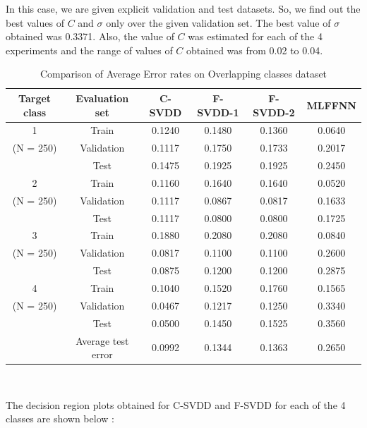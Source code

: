 \documentclass{article} %
\begin{document}
In this case, we are given explicit validation and test datasets. So, we find out the best values of $C$ and $\sigma$ only over the given validation set. The best value of $\sigma$ obtained was 0.3371. Also, the value of $C$ was estimated for each of the 4 experiments and the range of values of $C$ obtained was from 0.02 to 0.04.
\begin{table}[H]
\begin{center}
\caption{Comparison of Average Error rates on Overlapping classes dataset}
\begin{tabular}{|c|c|c|c|c|c|}
\hline
Target class & Evaluation set & C-SVDD & F-SVDD-1 & F-SVDD-2 & MLFFNN \\ \hline
 1 & Train & 0.1240 & 0.1480 & 0.1360 & 0.0640 \\ 
 (N = 250) & Validation & 0.1117 & 0.1750 & 0.1733 & 0.2017 \\ 
 & Test &  0.1475 & 0.1925 &  0.1925 & 0.2450 \\ \hline
 
 2 & Train & 0.1160 & 0.1640 & 0.1640 & 0.0520 \\ 
  (N = 250)& Validation &  0.1117  &  0.0867 &  0.0817 & 0.1633 \\ 
 & Test &  0.1117  &  0.0800 & 0.0800  & 0.1725 \\ \hline
 
 
 3 & Train & 0.1880 & 0.2080  & 0.2080 & 0.0840 \\ 
 (N = 250) & Validation & 0.0817 & 0.1100 &  0.1100 & 0.2600 \\ 
 & Test &  0.0875 &  0.1200 & 0.1200  & 0.2875 \\ \hline
 
 
 4 & Train & 0.1040 & 0.1520 &  0.1760 & 0.1565 \\ 
 (N = 250) & Validation &  0.0467 & 0.1217 & 0.1250 & 0.3340 \\ 
 & Test & 0.0500 &  0.1450 &  0.1525 & 0.3560 \\ \hline
 
& Average test error  &  0.0992 &  0.1344 & 0.1363 & 0.2650 \\ \hline

\end{tabular} \\[10pt]
\end{center}

\end{table}

The decision region plots obtained for C-SVDD and F-SVDD for each of the 4 classes are shown below :
\end{document}
